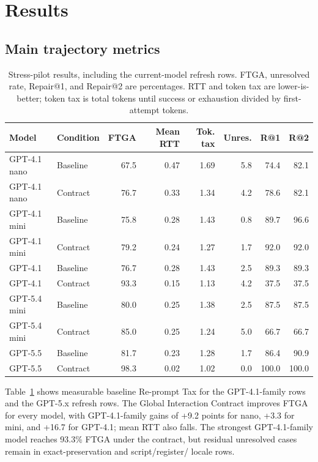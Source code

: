 \section{Results}

\subsection{Main trajectory metrics}

\begin{table}[t]
\centering
\small
\begin{tabular}{llrrrrrr}
\toprule
Model & Condition & FTGA & Mean RTT & Tok. tax & Unres. & R@1 & R@2 \\
\midrule
GPT-4.1 nano & Baseline & 67.5 & 0.47 & 1.69 & 5.8 & 74.4 & 82.1 \\
GPT-4.1 nano & Contract & 76.7 & 0.33 & 1.34 & 4.2 & 78.6 & 82.1 \\
GPT-4.1 mini & Baseline & 75.8 & 0.28 & 1.43 & 0.8 & 89.7 & 96.6 \\
GPT-4.1 mini & Contract & 79.2 & 0.24 & 1.27 & 1.7 & 92.0 & 92.0 \\
GPT-4.1 & Baseline & 76.7 & 0.28 & 1.43 & 2.5 & 89.3 & 89.3 \\
GPT-4.1 & Contract & 93.3 & 0.15 & 1.13 & 4.2 & 37.5 & 37.5 \\
GPT-5.4 mini & Baseline & 80.0 & 0.25 & 1.38 & 2.5 & 87.5 & 87.5 \\
GPT-5.4 mini & Contract & 85.0 & 0.25 & 1.24 & 5.0 & 66.7 & 66.7 \\
GPT-5.5 & Baseline & 81.7 & 0.23 & 1.28 & 1.7 & 86.4 & 90.9 \\
GPT-5.5 & Contract & 98.3 & 0.02 & 1.02 & 0.0 & 100.0 & 100.0 \\
\bottomrule
\end{tabular}
\caption{Stress-pilot results, including the current-model refresh rows. FTGA, unresolved rate, Repair@1, and Repair@2 are percentages. RTT and token tax are lower-is-better; token tax is total tokens until success or exhaustion divided by first-attempt tokens.}
\label{tab:main}
\end{table}

Table~\ref{tab:main} shows measurable baseline Re-prompt Tax for the
GPT-4.1-family rows and the GPT-5.x refresh rows. The Global Interaction
Contract improves FTGA for every model, with GPT-4.1-family gains of +9.2
points for nano, +3.3 for mini, and +16.7 for GPT-4.1; mean RTT also falls.
The strongest GPT-4.1-family model reaches 93.3\% FTGA under the contract, but
residual unresolved cases remain in exact-preservation and script/register/
locale rows.

